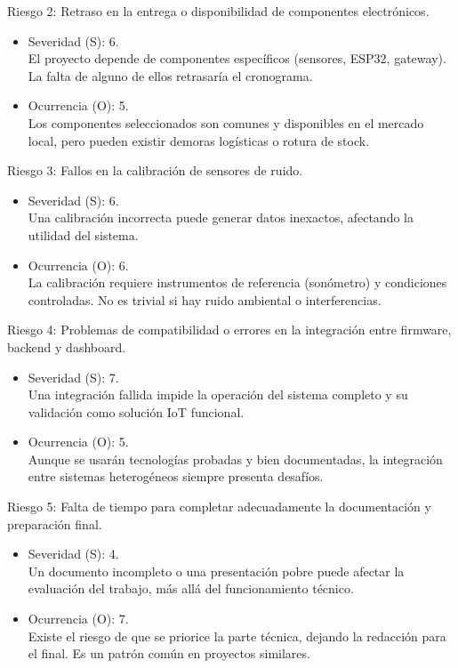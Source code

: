\documentclass[
11pt, %
]{charter}
\begin{document}
Riesgo 2: Retraso en la entrega o disponibilidad de componentes electrónicos.
\begin{itemize}
	\item Severidad (S): 6.\\
	El proyecto depende de componentes específicos (sensores, ESP32, gateway). La falta de alguno de ellos retrasaría el cronograma.
	\item Ocurrencia (O): 5.\\
	Los componentes seleccionados son comunes y disponibles en el mercado local, pero pueden existir demoras logísticas o rotura de stock.
\end{itemize}

Riesgo 3: Fallos en la calibración de sensores de ruido.
\begin{itemize}
	\item Severidad (S): 6.\\
	Una calibración incorrecta puede generar datos inexactos, afectando la utilidad del sistema.
	\item Ocurrencia (O): 6.\\
	La calibración requiere instrumentos de referencia (sonómetro) y condiciones controladas. No es trivial si hay ruido ambiental o interferencias.
\end{itemize}

Riesgo 4: Problemas de compatibilidad o errores en la integración entre firmware, backend y dashboard.
\begin{itemize}
	\item Severidad (S): 7.\\
	Una integración fallida impide la operación del sistema completo y su validación como solución IoT funcional.
	\item Ocurrencia (O): 5.\\
	Aunque se usarán tecnologías probadas y bien documentadas, la integración entre sistemas heterogéneos siempre presenta desafíos.
\end{itemize}

Riesgo 5: Falta de tiempo para completar adecuadamente la documentación y preparación final.
\begin{itemize}
	\item Severidad (S): 4.\\
	Un documento incompleto o una presentación pobre puede afectar la evaluación del trabajo, más allá del funcionamiento técnico.
	\item Ocurrencia (O): 7.\\
	Existe el riesgo de que se priorice la parte técnica, dejando la redacción para el final. Es un patrón común en proyectos similares.
\end{itemize}
\end{document}
